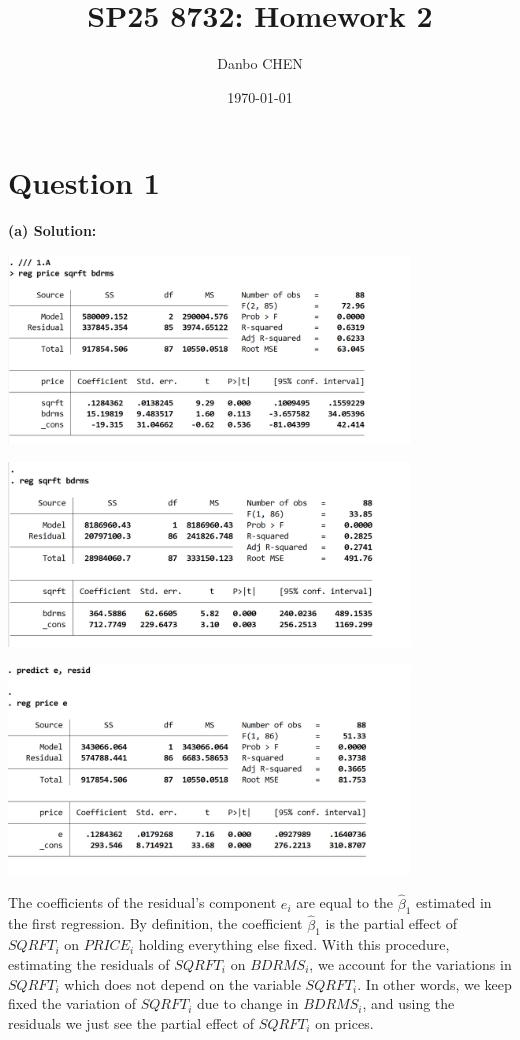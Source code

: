 \documentclass[12pt, oneside]{article}
\title{SP25 8732: Homework 2}
\author{Danbo CHEN}
\date{\today}
\begin{document}
\maketitle
\vspace{.25in}

\section{Question 1}
\textbf{(a) Solution:}

\begin{center}
    
    \includegraphics[width=0.8\textwidth]{Figure/P1.A.jpg}

    \includegraphics[width=0.8\textwidth]{Figure/P1.B.jpg}

    \includegraphics[width=0.8\textwidth]{Figure/P1.C.jpg}

\end{center}

The coefficients of the residual’s component $e_i$ are equal to the $\hat{\beta}_1$ estimated in the first regression. By definition, the coefficient $\hat{\beta}_1$ is the partial effect of $SQRFT_i$ on $PRICE_i$ holding everything else fixed. With this procedure, estimating the residuals of $SQRFT_i$ on $BDRMS_i$, we account for the variations in $SQRFT_i$ which does not depend on the variable $SQRFT_i$. In other words, we keep fixed the variation of $SQRFT_i$ due to change in $BDRMS_i$, and using the residuals we just see the partial effect of $SQRFT_i$ on prices.
\end{document}
